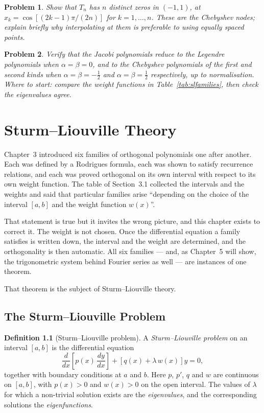 \documentclass[12pt,a4paper]{report}
\theoremstyle{definition}
\newtheorem{defn}[thm]{Definition}
\theoremstyle{plain}
\newtheorem{problemx}{Problem}[section]
\newenvironment{problem}{\begin{problemx}}{\end{problemx}}
\begin{document}
\begin{problem}
Show that $T_n$ has $n$ distinct zeros in $(-1,1)$, at
$x_k = \cos\left[\left(2k-1\right)\pi/(2n)\right]$ for $k=1,\dots,n$. These are
the \emph{Chebyshev nodes}; explain briefly why interpolating at them is
preferable to using equally spaced points.
\end{problem}

\begin{problem}
Verify that the Jacobi polynomials reduce to the Legendre polynomials when
$\alpha=\beta=0$, and to the Chebyshev polynomials of the first and second kinds
when $\alpha=\beta=-\tfrac12$ and $\alpha=\beta=\tfrac12$ respectively, up to
normalisation.
\emph{Where to start: compare the weight functions in
Table~\ref{tab:slfamilies}, then check the eigenvalues agree.}
\end{problem}

\chapter{Sturm--Liouville Theory}

Chapter~3 introduced six families of orthogonal polynomials one after another.
Each was defined by a Rodrigues formula, each was shown to satisfy recurrence
relations, and each was proved orthogonal on its own interval with respect to
its own weight function. The table of Section~3.1 collected the intervals and
the weights and said that particular families arise ``depending on the choice of
the interval $[a,b]$ and the weight function $w(x)$''.

That statement is true but it invites the wrong picture, and this chapter exists
to correct it. The weight is not chosen. Once the differential equation a family
satisfies is written down, the interval and the weight are determined, and the
orthogonality is then automatic. All six families --- and, as Chapter~5 will
show, the trigonometric system behind Fourier series as well --- are instances of
one theorem.

That theorem is the subject of Sturm--Liouville theory.

\section{The Sturm--Liouville Problem}

\begin{defn}[Sturm--Liouville problem]
A \emph{Sturm--Liouville problem} on an interval $[a,b]$ is the differential
equation
\begin{equation}
\frac{d}{dx}\left[p(x)\,\frac{dy}{dx}\right] + \left[q(x) + \lambda\, w(x)\right] y = 0,
\label{eq:sl}
\end{equation}
together with boundary conditions at $a$ and $b$. Here $p$, $p'$, $q$ and $w$
are continuous on $[a,b]$, with $p(x)>0$ and $w(x)>0$ on the open interval. The
values of $\lambda$ for which a non-trivial solution exists are the
\emph{eigenvalues}, and the corresponding solutions the \emph{eigenfunctions}.
\end{defn}
\end{document}
